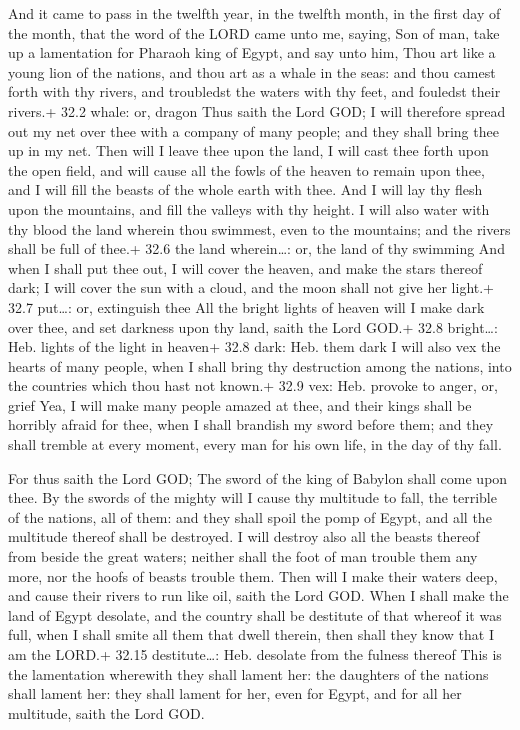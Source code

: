  And it came to pass in the twelfth year, in the twelfth
month, in the first day of the month, that the word of the LORD came
unto me, saying,  Son of man, take up a lamentation for
Pharaoh king of Egypt, and say unto him, Thou art like a young lion of
the nations, and thou art as a whale in the seas: and thou camest forth
with thy rivers, and troubledst the waters with thy feet, and fouledst
their rivers.+ 32.2 whale: or, dragon  Thus saith the Lord
GOD; I will therefore spread out my net over thee with a company of many
people; and they shall bring thee up in my net.  Then will I
leave thee upon the land, I will cast thee forth upon the open field,
and will cause all the fowls of the heaven to remain upon thee, and I
will fill the beasts of the whole earth with thee.  And I
will lay thy flesh upon the mountains, and fill the valleys with thy
height.  I will also water with thy blood the land wherein
thou swimmest, even to the mountains; and the rivers shall be full of
thee.+ 32.6 the land wherein\ldots: or, the land of thy swimming
 And when I shall put thee out, I will cover the heaven, and
make the stars thereof dark; I will cover the sun with a cloud, and the
moon shall not give her light.+ 32.7 put\ldots: or, extinguish thee
 All the bright lights of heaven will I make dark over thee,
and set darkness upon thy land, saith the Lord GOD.+ 32.8 bright\ldots:
Heb. lights of the light in heaven+ 32.8 dark: Heb. them dark
 I will also vex the hearts of many people, when I shall
bring thy destruction among the nations, into the countries which thou
hast not known.+ 32.9 vex: Heb. provoke to anger, or, grief
 Yea, I will make many people amazed at thee, and their
kings shall be horribly afraid for thee, when I shall brandish my sword
before them; and they shall tremble at every moment, every man for his
own life, in the day of thy fall.

 For thus saith the Lord GOD; The sword of the king of
Babylon shall come upon thee.  By the swords of the mighty
will I cause thy multitude to fall, the terrible of the nations, all of
them: and they shall spoil the pomp of Egypt, and all the multitude
thereof shall be destroyed.  I will destroy also all the
beasts thereof from beside the great waters; neither shall the foot of
man trouble them any more, nor the hoofs of beasts trouble them.
 Then will I make their waters deep, and cause their rivers
to run like oil, saith the Lord GOD.  When I shall make the
land of Egypt desolate, and the country shall be destitute of that
whereof it was full, when I shall smite all them that dwell therein,
then shall they know that I am the LORD.+ 32.15 destitute\ldots: Heb.
desolate from the fulness thereof  This is the lamentation
wherewith they shall lament her: the daughters of the nations shall
lament her: they shall lament for her, even for Egypt, and for all her
multitude, saith the Lord GOD.

